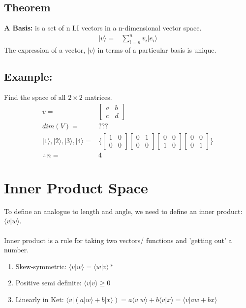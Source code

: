 \documentclass[12pt]{article}
\begin{document}
\subsection*{Theorem}
\textbf{A Basis:} is a set of n LI vectors in a n-dimensional vector space.
\begin{align*}
|v\rangle =& \sum^n_{i=n}v_i |e_i\rangle
\end{align*}
The expression of a vector, $|v\rangle$ in terms of a particular basis is unique.

\subsection*{Example:}
Find the space of all $2\times2$ matrices.
\begin{align*}
v =& 
\begin{bmatrix}
a&b\\
c&d
\end{bmatrix}
\\
dim(V) =& ???
\\
|1\rangle,|2\rangle,|3\rangle,|4\rangle =&
\bigg\{
\begin{bmatrix}
1&0\\
0&0
\end{bmatrix}
\begin{bmatrix}
0&1\\
0&0
\end{bmatrix}
\begin{bmatrix}
0&0\\
1&0
\end{bmatrix}
\begin{bmatrix}
0&0\\
0&1
\end{bmatrix}
\bigg\}
\\
\therefore \, n =& 4
\end{align*}

\section{Inner Product Space}
To define an analogue to length and angle, we need to define an inner product: $\langle v|w\rangle$.\\
\\
Inner product is a rule for taking two vectors/ functions and 
'getting out' a number.
\begin{enumerate}
\item Skew-symmetric: $\langle v|w\rangle = \langle w|v\rangle*$
\item Positive semi definite: $\langle v | v \rangle \geq 0$
\item Linearly in Ket: $\langle v|(a|w\rangle+b|x\rangle) = a\langle v|w\rangle + b\langle v|x\rangle = \langle v |aw + bx\rangle$
\end{enumerate}
\end{document}
